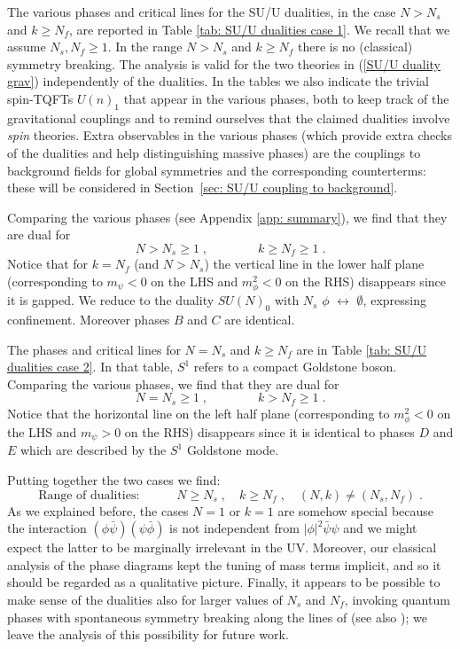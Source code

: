 \documentclass[a4paper, 12pt]{article}
\numberwithin{equation}{section}
\newcommand{\be}{\begin{equation}} \newcommand{\ee}{\end{equation}}
\begin{document}
The various phases and critical lines for the SU/U dualities, in the case $N>N_s$ and $k \geq N_f$, are reported in Table \ref{tab: SU/U dualities case 1}. We recall that we assume $N_s, N_f \geq 1$. In the range $N>N_s$ and $k \geq N_f$ there is no (classical) symmetry breaking. The analysis is valid for the two theories in (\ref{SU/U duality grav}) independently of the dualities. In the tables we also indicate the trivial spin-TQFTs $U(n)_1$ that appear in the various phases, both to keep track of the gravitational couplings and to remind ourselves that the claimed dualities involve \emph{spin} theories. Extra observables in the various phases (which provide extra checks of the dualities and help distinguishing massive phases) are the couplings to background fields for global symmetries and the corresponding counterterms: these will be considered in Section~\ref{sec: SU/U coupling to background}.

Comparing the various phases (see Appendix \ref{app: summary}), we find that they are dual for
\be
N > N_s \geq 1 \;,\qquad\qquad k \geq N_f \geq 1 \;.
\ee
Notice that for $k = N_f$ (and $N > N_s$) the vertical line in the lower half plane (corresponding to $m_\psi<0$ on the LHS and $m_\phi^2<0$ on the RHS) disappears since it is gapped. We reduce to the duality $SU(N)_0$ with $N_s$ $\phi$ $\leftrightarrow$ $\emptyset$, expressing confinement. Moreover phases $B$ and $C$ are identical.

The phases and critical lines for $N = N_s$ and $k \geq N_f$ are in Table \ref{tab: SU/U dualities case 2}. In that table, $S^1$ refers to a compact Goldstone boson. Comparing the various phases, we find that they are dual for
\be
N = N_s \geq 1 \;,\qquad\qquad k > N_f \geq 1 \;.
\ee
Notice that the horizontal line on the left half plane (corresponding to $m_\phi^2<0$ on the LHS and $m_\psi>0$ on the RHS) disappears since it is identical to phases $D$ and $E$ which are described by the $S^1$ Goldstone mode.

Putting together the two cases we find:
\be
\label{range SU/U}
\text{Range of dualities:}\qquad\quad N \geq N_s \;, \quad k \geq N_f \;,\quad (N,k) \neq (N_s,N_f) \;.
\ee
As we explained before, the cases $N=1$ or $k=1$ are somehow special because the interaction $(\phi\bar\psi)(\psi\bar\phi)$ is not independent from $|\phi|^2 \bar\psi\psi$ and we might expect the latter to be marginally irrelevant in the UV. Moreover, our classical analysis of the phase diagrams kept the tuning of mass terms implicit, and so it should be regarded as a qualitative picture. Finally, it appears to be possible to make sense of the dualities also for larger values of $N_s$ and $N_f$, invoking quantum phases with spontaneous symmetry breaking along the lines of \cite{Komargodski:2017keh} (see also \cite{Gaiotto:2017tne}); we leave the analysis of this possibility for future work.
\end{document}
